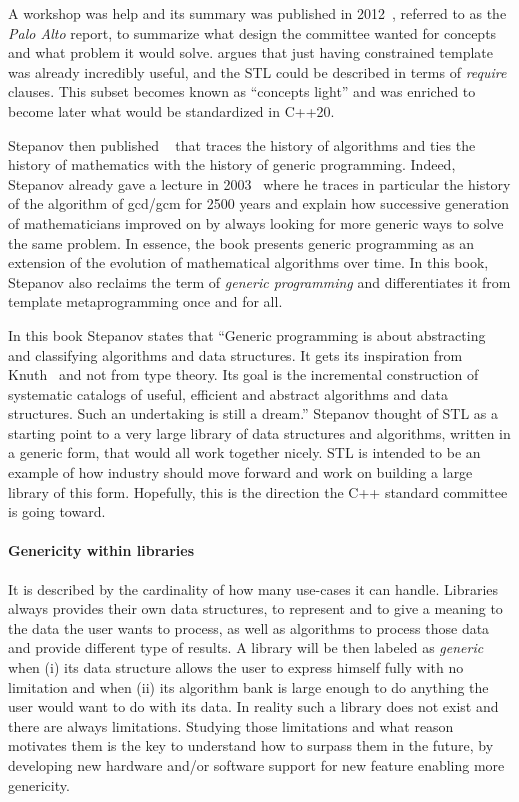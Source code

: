 A workshop was help and its summary was published in 2012~\parencite{sutton.2012.concepts}, referred to as the
\emph{Palo Alto} report, to summarize what design the committee wanted for concepts and what problem it would solve.
 argues that just having constrained template was already incredibly useful, and the
STL could be described in terms of \emph{require} clauses. This subset becomes known as ``concepts light'' and was
enriched to become later what would be standardized in C++20.

Stepanov then published ~\parencite{stepanov.2014.mathematics} that traces the
history of algorithms and ties the history of mathematics with the history of generic programming. Indeed, Stepanov
already gave a lecture in 2003~\parencite{stepanov.2003.gcm} where he traces in particular the history of the algorithm
of gcd/gcm for 2500 years and explain how successive generation of mathematicians improved on by always looking for more
generic ways to solve the same problem. In essence, the book presents generic programming as an extension of the
evolution of mathematical algorithms over time. In this book, Stepanov also reclaims the term of \emph{generic
  programming} and differentiates it from template metaprogramming once and for all.

In this book Stepanov states that ``Generic programming is about abstracting and classifying algorithms and data
structures. It gets its inspiration from Knuth~\parencite{knuth.2014.art} and not from type theory. Its goal is the
incremental construction of systematic catalogs of useful, efficient and abstract algorithms and data structures. Such
an undertaking is still a dream.'' Stepanov thought of STL as a starting point to a very large library of data
structures and algorithms, written in a generic form, that would all work together nicely. STL is intended to be an
example of how industry should move forward and work on building a large library of this form. Hopefully, this is the
direction the C++ standard committee is going toward.

\paragraph{Genericity within libraries} It is described by the cardinality of how many use-cases it can handle.
Libraries always provides their own data structures, to represent and to give a meaning to the data the user wants to
process, as well as algorithms to process those data and provide different type of results. A library will be then
labeled as \emph{generic}~\parencite{musser.1994.algorithm} when (i) its data structure allows the user to express
himself fully with no limitation and when (ii) its algorithm bank is large enough to do anything the user would want to
do with its data. In reality such a library does not exist and there are always limitations. Studying those limitations
and what reason motivates them is the key to understand how to surpass them in the future, by developing new hardware
and/or software support for new feature enabling more genericity.


